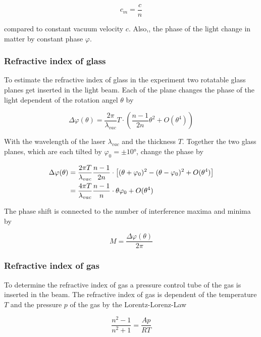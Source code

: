 \begin{equation}
    c_m=\frac{c}{n}
\end{equation}

compared to constant vacuum velocity $c$. 
Also,, the phase of the light change in matter by constant phase $\varphi $. 

\subsubsection{Refractive index of glass}
To estimate the refractive index of glass in the experiment two rotatable glass planes get inserted in the light beam. 
Each of the plane changes the phase of the light dependent of the rotation angel $\theta $ by

\begin{equation}
    \Delta \varphi(\theta ) =\frac{2\pi }{\lambda_{vac}}T \cdot \left(\frac{n-1}{2n}\theta ^2 +O(\theta ^4)  \right)
\end{equation}

With the wavelength of the laser $\lambda_{vac}$ and the thickness $T$.
Together the two glass planes, which are each tilted by $\varphi_0=\pm 10°$, change the phase by 

\begin{align}
    \Delta \varphi(\theta ) &=\frac{2\pi T}{\lambda_{vac}} \frac{n-1}{2n} \cdot \left[(\theta+\varphi_0)^2 - (\theta-\varphi_0)^2 +O(\theta ^4)  \right] \notag\\
                            &=\frac{4\pi T}{\lambda_{vac}} \frac{n-1}{n} \cdot \theta\varphi_0 +O(\theta ^4)
\end{align}

The phase shift is connected to the number of interference maxima and minima by 

\begin{equation}
    M=\frac{\Delta \varphi(\theta)}{2\pi}
\end{equation}

\subsubsection{Refractive index of gas}
To determine the refractive index of gas a pressure control tube of the gas is inserted in the beam.
The refractive index of gas is dependent of the temperature $T$ and the pressure $p$ of the gas by the Lorentz-Lorenz-Law

\begin{equation}
    \frac{n^2-1}{n^2+1}=\frac{Ap}{RT}
\end{equation}

